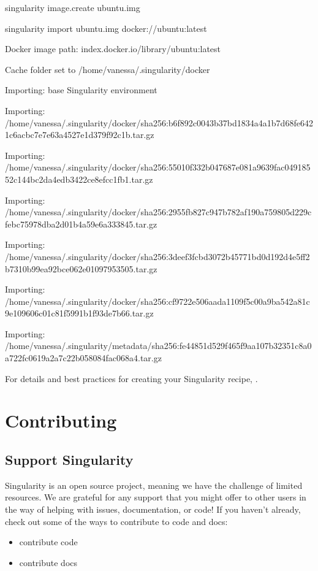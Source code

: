 \documentclass[letterpaper,10pt,english]{sphinxmanual}
\begin{document}
%
\begin{sphinxVerbatim}[commandchars=\\\{\}]
\PYGZdl{} singularity image.create ubuntu.img

singularity import ubuntu.img docker://ubuntu:latest

Docker image path: index.docker.io/library/ubuntu:latest

Cache folder set to /home/vanessa/.singularity/docker

Importing: base Singularity environment

Importing: /home/vanessa/.singularity/docker/sha256:b6f892c0043b37bd1834a4a1b7d68fe6421c6acbc7e7e63a4527e1d379f92c1b.tar.gz

Importing: /home/vanessa/.singularity/docker/sha256:55010f332b047687e081a9639fac04918552c144bc2da4edb3422ce8efcc1fb1.tar.gz

Importing: /home/vanessa/.singularity/docker/sha256:2955fb827c947b782af190a759805d229cfebc75978dba2d01b4a59e6a333845.tar.gz

Importing: /home/vanessa/.singularity/docker/sha256:3deef3fcbd3072b45771bd0d192d4e5ff2b7310b99ea92bce062e01097953505.tar.gz

Importing: /home/vanessa/.singularity/docker/sha256:cf9722e506aada1109f5c00a9ba542a81c9e109606c01c81f5991b1f93de7b66.tar.gz

Importing: /home/vanessa/.singularity/metadata/sha256:fe44851d529f465f9aa107b32351c8a0a722fc0619a2a7c22b058084fac068a4.tar.gz
\end{sphinxVerbatim}

For details and best practices for creating your Singularity recipe, {\hyperref[\detokenize{container_recipes:container-recipes}]{}}.


\chapter{Contributing}
\label{\detokenize{contributing:contributing}}\label{\detokenize{contributing::doc}}

\section{Support Singularity}
\label{\detokenize{contributing:support-singularity}}
Singularity is an open source project, meaning we have the challenge of limited resources.
We are grateful for any support that you might offer to other users in the way of helping with issues, documentation,
or code! If you haven’t already, check out some of the ways to contribute to code and docs:
\begin{itemize}
\item {} 
contribute code

\item {} 
contribute docs

\end{itemize}
\end{document}
